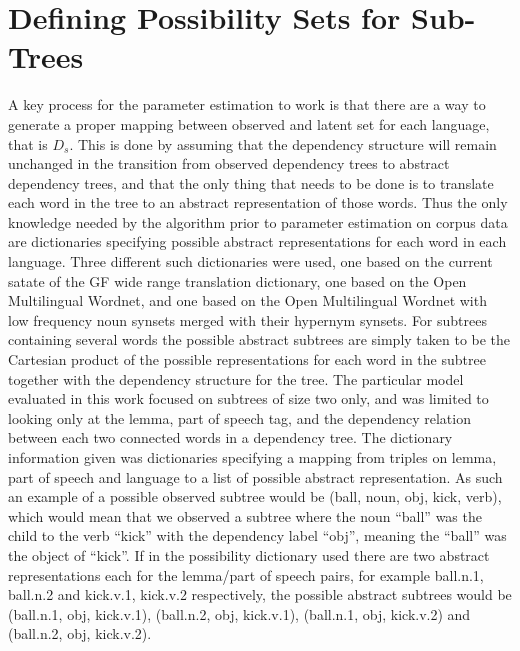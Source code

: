\section{Defining Possibility Sets for Sub-Trees}
A key process for the parameter estimation to work is that there are a way to generate a proper mapping between observed and latent set for each language, that is $D_s$. This is done by assuming that the dependency structure will remain unchanged in the transition from observed dependency trees to abstract dependency trees, and that the only thing that needs to be done is to translate each word in the tree to an abstract representation of those words. Thus the only knowledge needed by the algorithm prior to parameter estimation on corpus data are dictionaries specifying possible abstract representations for each word in each language. Three different such dictionaries were used, one based on the current satate of the GF wide range translation dictionary, one based on the Open Multilingual Wordnet, and one based on the Open Multilingual Wordnet with low frequency noun synsets merged with their hypernym synsets. For subtrees containing several words the possible abstract subtrees are simply taken to be the Cartesian product of the possible representations for each word in the subtree together with the dependency structure for the tree. The particular model evaluated in this work focused on subtrees of size two only, and was limited to looking only at the lemma, part of speech tag, and the dependency relation between each two connected words in a dependency tree. The dictionary information given was dictionaries specifying a mapping from triples on lemma, part of speech and language to a list of possible abstract representation. As such an example of a possible observed subtree would be (ball, noun, obj, kick, verb), which would mean that we observed a subtree where the noun ``ball'' was the child to the verb ``kick'' with the dependency label ``obj'', meaning the ``ball'' was the object of ``kick''. If in the possibility dictionary used there are two abstract representations each for the lemma/part of speech pairs, for example ball.n.1, ball.n.2 and kick.v.1, kick.v.2 respectively, the possible abstract subtrees would be (ball.n.1, obj, kick.v.1), (ball.n.2, obj, kick.v.1), (ball.n.1, obj, kick.v.2) and (ball.n.2, obj, kick.v.2).


